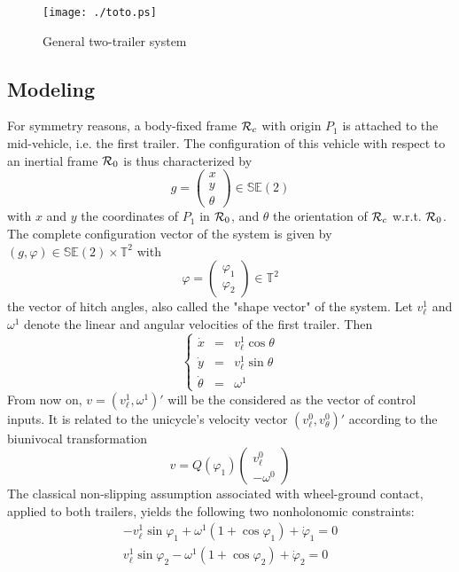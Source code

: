 \documentclass[a4paper,twoside]{article}
\def \TT {{\mathbb T}}
\def \SE {{\mathbb S}{\mathbb E}}
\begin{document}
\begin{figure}[htbp]
\centering
\texttt{[image: ./toto.ps]}
\caption{General two-trailer system }
\label{fig-trailer}
\end{figure} 

\subsection{Modeling}

For symmetry reasons, a body-fixed frame ${\cal R}_c$ with origin $P_1$ is attached to the mid-vehicle, i.e. the first trailer. 
The configuration of this vehicle with respect to an inertial frame 
${\cal R}_0$ is thus characterized by
\[
g = \begin{pmatrix}
x \\
y \\
\theta
\end{pmatrix} \in \SE(2)
\] 
with $x$ and $y$ the coordinates of $P_1$ in ${\cal R}_0$, and $\theta$ the orientation of 
${\cal R}_c$ w.r.t. ${\cal R}_0$.  The complete configuration vector of the system is 
given by $(g, \varphi) \in \SE(2) \times \TT^2$ with
\[
\varphi = \begin{pmatrix}
\varphi_1 \\
\varphi_2
\end{pmatrix} \in \TT^2
\]
the vector of hitch angles, also called the "shape vector" of the system.
Let $v_\ell^1$ and $\omega^1$ denote the linear and angular velocities of the first trailer. Then
\begin{equation}
\label{kin-se2}
\left \{
\begin{array}{lcl}
\dot  x & = & v_\ell^1 \cos \theta \\
\dot  y & = & v_\ell^1 \sin \theta \\
\dot \theta & = & \omega^1
\end{array}
\right.
\end{equation}
From now on, $v= (v_\ell^1, \omega^1)'$ will be the considered as the vector of control inputs. It is related to the unicycle's 
velocity vector $(v_\ell^0,v_\theta^0)'$ according to the biunivocal transformation
\[
v= Q(\varphi_1) \begin{pmatrix}
v_\ell^0 \\[1ex]
-\omega^0
\end{pmatrix}
\]
The classical non-slipping assumption associated with wheel-ground contact, applied to both
trailers, yields the following two nonholonomic constraints:
\[
\begin{array}{l}
-v_\ell^1 \sin \varphi_1 + \omega^1(1+\cos \varphi_1) + \dot \varphi_1 = 0 \\ 
v_\ell^1 \sin \varphi_2 - \omega^1(1+\cos \varphi_2) + \dot \varphi_2 =0
\end{array}
\]
\end{document}
